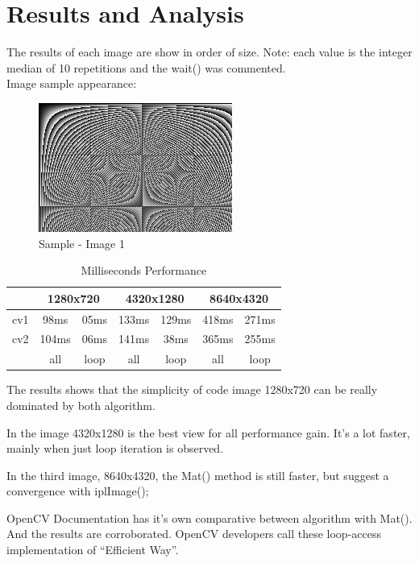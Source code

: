 \section{Results and Analysis}\label{sec:4}
\graphicspath{ {../} }
    The results of each image are show in order of size. Note: each value is the integer median of 10 repetitions and the wait() was commented.\\

    Image sample appearance:

    \begin{figure}[h!]
        \caption{Sample - Image 1}
        \includegraphics{sample.png}
    \end{figure}

\begin{table}[h!]
    \centering
    \caption{Milliseconds Performance}
    \label{tab1}
        \begin{tabular}{ccccccc}
        \hline
            & \multicolumn{2}{c}{1280x720} & \multicolumn{2}{c}{4320x1280} & \multicolumn{2}{c}{8640x4320} \\\hline
        cv1 & 98ms          & 05ms         & 133ms         & 129ms         & 418ms         & 271ms         \\\hline
        cv2 & 104ms         & 06ms         & 141ms         & 38ms          & 365ms         & 255ms         \\\hline
            & all           & loop         & all           & loop          & all           & loop          \\\hline
\end{tabular}
\end{table}

    The results shows that the simplicity of code image 1280x720 can be really dominated by both algorithm.  

    In the image 4320x1280 is the best view for all performance gain. It's a lot faster, mainly when just loop iteration is observed.

    In the third image, 8640x4320, the Mat() method is still faster, but suggest a convergence with iplImage(); 

    OpenCV Documentation has it's own comparative between algorithm with Mat(). And the results are corroborated. OpenCV developers call these loop-access implementation of ``Efficient Way''.  